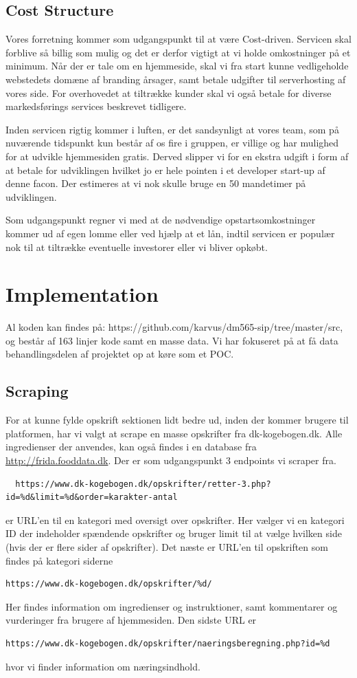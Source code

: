 \documentclass[a4paper,]{article}
\begin{document}
\subsection{Cost Structure}
Vores forretning kommer som udgangspunkt til at være Cost-driven. Servicen skal forblive så billig som mulig og det er derfor vigtigt at vi holde omkostninger på et minimum. Når der er tale om en hjemmeside, skal vi fra start kunne vedligeholde webstedets domæne af branding årsager, samt betale udgifter til serverhosting af vores side. For overhovedet at tiltrække kunder skal vi også betale for diverse markedsførings services beskrevet tidligere. 

Inden servicen rigtig kommer i luften, er det sandsynligt at vores team, som på nuværende tidspunkt kun består af os fire i gruppen, er villige og har mulighed for at udvikle hjemmesiden gratis. Derved slipper vi for en ekstra udgift i form af at betale for udviklingen hvilket jo er hele pointen i et developer start-up af denne facon. Der estimeres at vi nok skulle bruge en 50 mandetimer på udviklingen.

Som udgangspunkt regner vi med at de nødvendige opstartsomkostninger kommer ud af egen lomme eller ved hjælp at et lån, indtil servicen er populær nok til at tiltrække eventuelle investorer eller vi bliver opkøbt. 


\newpage
\section{Implementation}

Al koden kan findes på: https://github.com/karvus/dm565-sip/tree/master/src, og består af 163 linjer kode samt en masse data. Vi har fokuseret på at få data behandlingsdelen af projektet op at køre som et POC.

\subsection{Scraping}
For at kunne fylde opskrift sektionen lidt bedre ud, inden der kommer
brugere til platformen, har vi valgt at scrape en masse opskrifter fra
dk-kogebogen.dk. Alle ingredienser der anvendes, kan også findes i en
database fra \url{http://frida.fooddata.dk}. Der er som udgangspunkt 3 endpoints vi
scraper fra.
\begin{verbatim}
  https://www.dk-kogebogen.dk/opskrifter/retter-3.php?id=%d&limit=%d&order=karakter-antal
\end{verbatim}
er URL’en til en kategori med oversigt over opskrifter. Her vælger vi
en kategori ID der indeholder spændende opskrifter og bruger limit til
at vælge hvilken side (hvis der er flere sider af opskrifter).
Det næste er URL’en til opskriften som findes på kategori siderne
\begin{verbatim}
https://www.dk-kogebogen.dk/opskrifter/%d/
\end{verbatim}
Her findes
information om ingredienser og instruktioner, samt kommentarer og
vurderinger fra brugere af hjemmesiden.
Den sidste URL er
\begin{verbatim}
https://www.dk-kogebogen.dk/opskrifter/naeringsberegning.php?id=%d
\end{verbatim}
hvor vi finder information om næringsindhold.
\end{document}
